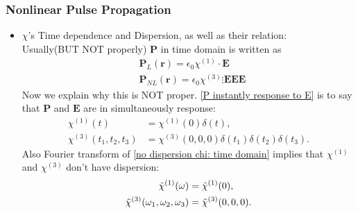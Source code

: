 \documentclass[12pt]{extarticle}
\numberwithin{equation}{section}
\numberwithin{figure}{section}
\numberwithin{table}{section}
\newcommand{\<}{\langle}
\renewcommand{\>}{\rangle}
\theoremstyle{definition}
\begin{document}
        \subsubsection{Nonlinear Pulse Propagation}
        \begin{itemize}
            \item $\chi$'s Time dependence and Dispersion, as well as their relation:\\
            
                Usually(BUT NOT properly) $\boldsymbol{P}$ in time domain is written as
                \begin{subequations}
                    \begin{align}
                        &\boldsymbol{P}_L(\boldsymbol{r}) = \epsilon_0 \chi^{(1)}\cdot\boldsymbol{E}\\
                        &\boldsymbol{P}_{NL}(\boldsymbol{r}) = \epsilon_0 \chi^{(3)} \vdots \boldsymbol{EEE}
                    \end{align}
                    \label{P instantly response to E}
                \end{subequations}
                Now we explain why this is NOT proper. \autoref{P instantly response to E} is to say that $\boldsymbol{P}$ and $\boldsymbol{E}$ are in simultaneously response:
                \begin{subequations}
                    \begin{align}
                        \chi^{(1)}(t)&=\chi^{(1)}(0)\delta(t),\\
                        \chi^{(3)}(t_1,t_2,t_3)&=\chi^{(3)}(0,0,0)\delta(t_1)\delta(t_2)\delta(t_3).
                    \end{align}
                    \label{no dispersion chi: time domain}
                \end{subequations}
                Also Fourier transform of \autoref{no dispersion chi: time domain} implies that $\chi^{(1)}$ and $\chi^{(3)}$ don't have dispersion:
                \begin{subequations}
                    \begin{align}
                        \Tilde{\chi}^{(1)}(\omega)&=\Tilde{\chi}^{(1)}(0),\\
                        \Tilde{\chi}^{(3)}(\omega_1,\omega_2,\omega_3)&=\Tilde{\chi}^{(3)}(0,0,0).
                    \end{align}
                    \label{no dispersion chi: freq domain}
                \end{subequations}

\end{itemize}
\end{document}
